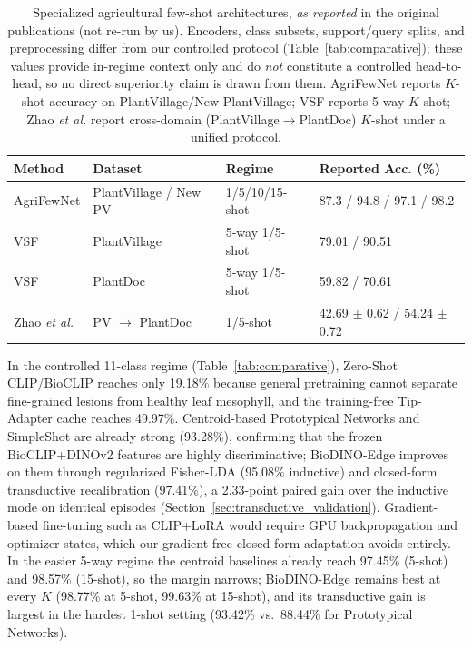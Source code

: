 \documentclass[preprint,12pt]{elsarticle}
\begin{document}
\begin{table}[htbp]
\centering
\caption{Specialized agricultural few-shot architectures, \emph{as reported} in the original publications (not re-run by us). Encoders, class subsets, support/query splits, and preprocessing differ from our controlled protocol (Table~\ref{tab:comparative}); these values provide in-regime context only and do \emph{not} constitute a controlled head-to-head, so no direct superiority claim is drawn from them. AgriFewNet reports $K$-shot accuracy on PlantVillage/New PlantVillage; VSF reports 5-way $K$-shot; Zhao \textit{et al.} report cross-domain (PlantVillage$\rightarrow$PlantDoc) $K$-shot under a unified protocol.}
\label{tab:literature}
\small
\begin{tabularx}{\textwidth}{l l l X}
\toprule
\textbf{Method} & \textbf{Dataset} & \textbf{Regime} & \textbf{Reported Acc. (\%)} \\
\midrule
AgriFewNet \cite{babu2025agrifewnet} & PlantVillage / New PV & 1/5/10/15-shot & 87.3 / 94.8 / 97.1 / 98.2 \\
VSF \cite{zhou2026vsf} & PlantVillage & 5-way 1/5-shot & 79.01 / 90.51 \\
VSF \cite{zhou2026vsf} & PlantDoc & 5-way 1/5-shot & 59.82 / 70.61 \\
Zhao \textit{et al.} \cite{zhao2026lightweight} & PV $\rightarrow$ PlantDoc & 1/5-shot & 42.69 $\pm$ 0.62 / 54.24 $\pm$ 0.72 \\
\bottomrule
\end{tabularx}
\end{table}

In the controlled 11-class regime (Table~\ref{tab:comparative}), Zero-Shot CLIP/BioCLIP reaches only 19.18\% because general pretraining cannot separate fine-grained lesions from healthy leaf mesophyll, and the training-free Tip-Adapter cache reaches 49.97\%. Centroid-based Prototypical Networks and SimpleShot are already strong (93.28\%), confirming that the frozen BioCLIP+DINOv2 features are highly discriminative; BioDINO-Edge improves on them through regularized Fisher-LDA (95.08\% inductive) and closed-form transductive recalibration (97.41\%), a 2.33-point paired gain over the inductive mode on identical episodes (Section~\ref{sec:transductive_validation}). Gradient-based fine-tuning such as CLIP+LoRA \cite{hu2022lora} would require GPU backpropagation and optimizer states, which our gradient-free closed-form adaptation avoids entirely. In the easier 5-way regime the centroid baselines already reach 97.45\% (5-shot) and 98.57\% (15-shot), so the margin narrows; BioDINO-Edge remains best at every $K$ (98.77\% at 5-shot, 99.63\% at 15-shot), and its transductive gain is largest in the hardest 1-shot setting (93.42\% vs.\ 88.44\% for Prototypical Networks).
\end{document}
